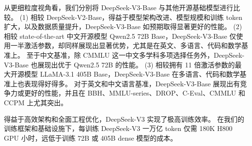 \documentclass[11pt, a4paper, logo, copyright, nonumbering]{deepseek}
\newcommand{\dsvii}{DeepSeek-V2}
\newcommand{\dsviii}{DeepSeek-V3}
\begin{document}
从更细粒度视角看，我们分别将 \dsviii{}-Base 与其他开源基础模型进行比较。
(1)
相较 \dsvii{}-Base，得益于模型架构改进、模型规模和训练 token 扩大，以及数据质量提升，\dsviii{}-Base 如预期取得显著更好的性能。
(2)
相较 state-of-the-art 中文开源模型 Qwen2.5 72B Base，\dsviii{}-Base 仅使用一半激活参数，却同样展现出显著优势，尤其是在英文、多语言、代码和数学基准上。
至于中文基准，除 CMMLU 这一中文多学科多项选择任务外，\dsviii{}-Base 也展现出优于 Qwen2.5 72B 的性能。
(3)
相较拥有 11 倍激活参数的最大开源模型 LLaMA-3.1 405B Base，\dsviii{}-Base 在多语言、代码和数学基准上也表现得好得多。
对于英文和中文语言基准，\dsviii{}-Base 展现出有竞争力或更好的性能，并且在 BBH、MMLU-series、DROP、C-Eval、CMMLU 和 CCPM 上尤其突出。

得益于高效架构和全面工程优化，\dsviii{} 实现了极高训练效率。
在我们的训练框架和基础设施下，每训练 \dsviii{} 一万亿 token 仅需 180K H800 GPU 小时，远低于训练 72B 或 405B dense 模型的成本。
\end{document}
